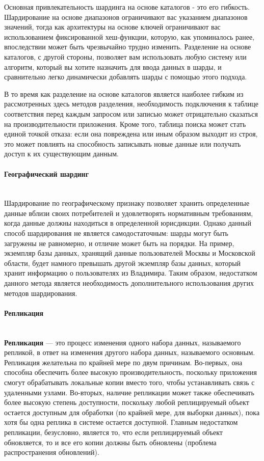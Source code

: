 Основная привлекательность шардинга на основе каталогов - это его гибкость. Шардирование на основе диапазонов
ограничивают вас указанием диапазонов значений, тогда как архитектуры на основе ключей ограничивают вас использованием
фиксированной хеш-функции, которую, как упоминалось ранее, впоследствии может быть чрезвычайно трудно изменить.
Разделение на основе каталогов, с другой стороны, позволяет вам использовать любую систему или алгоритм, который вы
хотите назначить для ввода данных в шарды, и сравнительно легко динамически добавлять шарды с помощью этого
подхода.

В то время как разделение на основе каталогов является наиболее гибким из рассмотренных здесь методов разделения,
необходимость подключения к таблице соответствия перед каждым запросом или записью может отрицательно сказаться на
производительности приложения. Кроме того, таблица поиска может стать единой точкой отказа: если она повреждена или
иным образом выходит из строя, это может повлиять на способность записывать новые данные или получать доступ к их
существующим данным.\autocite{DatabaseSharding}

\paragraph{Географический шардинг} ~\\
Шардирование по географическому признаку позволяет хранить определенные данные вблизи своих потребителей и
удовлетворять нормативным требованиям, когда данные должны находиться в определенной юрисдикции. Однако данный способ
шардирования не является самодостаточным: шарды могут быть загружены не равномерно, и отличие может быть на порядки.
На пример, экземпляр базы данных, хранящий данные пользователей Москвы и Московской области, будет намного превышать
другой экземпляр базы данных, который хранит информацию о пользователях из Владимира. Таким образом, недостатком
данного метода является необходимость дополнительного использования других методов шардирования.

\paragraph{Репликация} ~\\
\textbf{Репликация} — это процесс изменения одного набора данных, называемого репликой, в ответ на изменения другого
набора данных, называемого основным. Репликация желательна по крайней мере по двум причинам. Во-первых, она способна
обеспечить более высокую производительность, поскольку приложения смогут обрабатывать локальные копии вместо того,
чтобы устанавливать связь с удаленными узлами. Во-вторых, наличие репликации может также обеспечивать более высокую
степень доступности, поскольку любой реплицируемый объект остается доступным для обработки (по крайней мере, для выборки
данных), пока хотя бы одна реплика в системе остается доступной. Главным недостатком репликации, безусловно, является
то, что если реплицируемый объект обновляется, то и все его копии должны быть обновлены (проблема распространения
обновлений).

